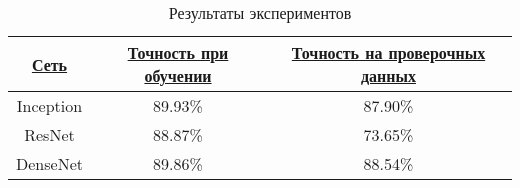 \begin{table}[H]
    \centering
    \caption{Результаты экспериментов} \label{test-results}
    \begin{tabular}{|c|c|c|}
      \hline    
      \hyperlink{network}{Сеть} & \hyperlink{accuracy}{Точность при обучении} & \hyperlink{val_accuracy}{Точность на проверочных данных}\\
      \hline
      Inception & 89.93\% & 87.90\% \\
      \hline
      ResNet & 88.87\% & 73.65\% \\
      \hline
      DenseNet & 89.86\% & 88.54\% \\
      \hline
    \end{tabular}
  \end{table}